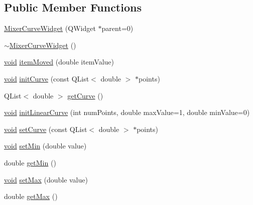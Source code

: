 \subsection*{\-Public \-Member \-Functions}
\begin{DoxyCompactItemize}
\item 
\hyperlink{group___u_a_v_object_widget_utils_gafcc28d34cf4bf00ed61926b4cbdd5a7e}{\-Mixer\-Curve\-Widget} (\-Q\-Widget $\ast$parent=0)
\item 
\hyperlink{group___u_a_v_object_widget_utils_ga95ab335915408821a081b9be9b837866}{$\sim$\-Mixer\-Curve\-Widget} ()
\item 
\hyperlink{group___u_a_v_objects_plugin_ga444cf2ff3f0ecbe028adce838d373f5c}{void} \hyperlink{group___u_a_v_object_widget_utils_ga1a7a9e06137eef080091ca11b1bf0c05}{item\-Moved} (double item\-Value)
\item 
\hyperlink{group___u_a_v_objects_plugin_ga444cf2ff3f0ecbe028adce838d373f5c}{void} \hyperlink{group___u_a_v_object_widget_utils_gaa776ac520f82de83862c18af0ff99ce3}{init\-Curve} (const \-Q\-List$<$ double $>$ $\ast$points)
\item 
\-Q\-List$<$ double $>$ \hyperlink{group___u_a_v_object_widget_utils_gad97c9f7b189fc9097da50ab5b8f08f4d}{get\-Curve} ()
\item 
\hyperlink{group___u_a_v_objects_plugin_ga444cf2ff3f0ecbe028adce838d373f5c}{void} \hyperlink{group___u_a_v_object_widget_utils_gad0a76288e7cbdf09fb112176d236dfde}{init\-Linear\-Curve} (int num\-Points, double max\-Value=1, double min\-Value=0)
\item 
\hyperlink{group___u_a_v_objects_plugin_ga444cf2ff3f0ecbe028adce838d373f5c}{void} \hyperlink{group___u_a_v_object_widget_utils_ga0738fd8e0cf67713c6553da77c284a71}{set\-Curve} (const \-Q\-List$<$ double $>$ $\ast$points)
\item 
\hyperlink{group___u_a_v_objects_plugin_ga444cf2ff3f0ecbe028adce838d373f5c}{void} \hyperlink{group___u_a_v_object_widget_utils_ga78338911bd3605c13be6672b2a94d346}{set\-Min} (double value)
\item 
double \hyperlink{group___u_a_v_object_widget_utils_gac199a42260bf4a3ddd42f23bae109569}{get\-Min} ()
\item 
\hyperlink{group___u_a_v_objects_plugin_ga444cf2ff3f0ecbe028adce838d373f5c}{void} \hyperlink{group___u_a_v_object_widget_utils_ga5575aabae9b71223eefe3e0a2ad39191}{set\-Max} (double value)
\item 
double \hyperlink{group___u_a_v_object_widget_utils_ga34c76c8602acb8377ecaead69dd32bd0}{get\-Max} ()

\end{DoxyCompactItemize}
